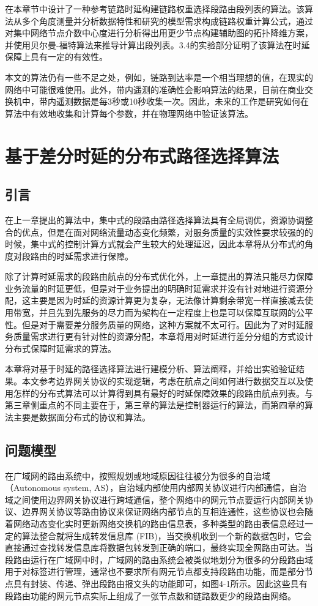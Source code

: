 在本章节中设计了一种参考链路时延构建链路权重选择段路由段列表的算法。该算法从多个角度测量并分析数据特性和研究的模型需求构成链路权重计算公式，通过对集中网络节点介数中心度进行分析得出用更少节点构建辅助图的拓扑降维方案，并使用贝尔曼-福特算法来推导计算出段列表。3.4的实验部分证明了该算法在时延保障上具有一定的有效性。

本文的算法仍有一些不足之处，例如，链路到达率是一个相当理想的值，在现实的网络中可能很难使用。此外，带内遥测的准确性会影响算法的结果，目前在商业交换机中，带内遥测数据是每3秒或10秒收集一次。因此，未来的工作是研究如何在算法中有效地收集和计算每个参数，并在物理网络中验证该算法。

\chapter{基于差分时延的分布式路径选择算法}

\section{引言}

在上一章提出的算法中，集中式的段路由路径选择算法具有全局调优，资源协调整合的优点，但是在面对网络流量动态变化频繁，对服务质量的实效性要求较强的的时候，集中式的控制计算方式就会产生较大的处理延迟，因此本章将从分布式的角度对段路由的时延需求进行保障。

除了计算时延需求的段路由航点的分布式优化外，上一章提出的算法只能尽力保障业务流量的时延更低，但是对于业务提出的明确时延需求并没有针对地进行资源分配，这主要是因为时延的资源计算更为复杂，无法像计算剩余带宽一样直接减去使用带宽，并且先到先服务的尽力而为架构在一定程度上也是可以保障互联网的公平性。但是对于需要差分服务质量的网络，这种方案就不太可行。因此为了对时延服务质量需求进行更有针对性的资源分配，本章将用对时延进行差分分组的方式设计分布式保障时延需求的算法。

本章将对基于时延的路径选择算法进行建模分析、算法阐释，并给出实验验证结果。本文参考边界网关协议的实现逻辑，考虑在航点之间如何进行数据交互以及使用怎样的分布式算法可以计算得到具有最好的时延保障效果的段路由航点列表。与第三章侧重点的不同主要在于，第三章的算法是控制器运行的算法，而第四章的算法主要是数据面分布式的协议和算法。

\section{问题模型}

在广域网的路由系统中，按照规划或地域原因往往被分为很多的自治域（Autonomous system, AS），自治域内部使用内部网关协议进行内部通信，自治域之间使用边界网关协议进行跨域通信，整个网络中的网元节点要运行内部网关协议、边界网关协议等路由协议来保证网络内部节点的互相连通性，这些协议也会随着网络动态变化实时更新网络交换机的路由信息表，多种类型的路由表信息经过一定的算法整合就将生成转发信息库 (FIB)，当交换机收到一个新的数据包时，它会直接通过查找转发信息库将数据包转发到正确的端口，最终实现全网路由可达。当段路由运行在广域网中时，广域网的路由系统会被类似地划分为很多的分段路由域用于对标签进行管理，通常也不要求所有网元节点都支持段路由功能，而是部分节点具有封装、传递、弹出段路由报文头的功能即可，如图4-1所示。因此这些具有段路由功能的网元节点实际上组成了一张节点数和链路数更少的段路由网络。

